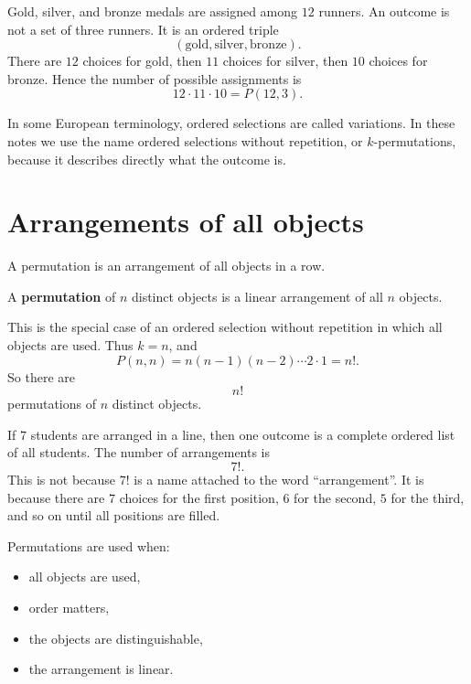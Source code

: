 \begin{examplebox}
Gold, silver, and bronze medals are assigned among \(12\) runners. An outcome is not a set of three runners. It is an ordered triple
\[
(\text{gold},\text{silver},\text{bronze}).
\]
There are \(12\) choices for gold, then \(11\) choices for silver, then \(10\) choices for bronze. Hence the number of possible assignments is
\[
12\cdot 11\cdot 10=P(12,3).
\]
\end{examplebox}

In some European terminology, ordered selections are called variations. In these notes we use the name ordered selections without repetition, or \(k\)-permutations, because it describes directly what the outcome is.

\section{Arrangements of all objects}

A permutation is an arrangement of all objects in a row.

\begin{definitionbox}
A \textbf{permutation} of \(n\) distinct objects is a linear arrangement of all \(n\) objects.
\end{definitionbox}

This is the special case of an ordered selection without repetition in which all objects are used. Thus \(k=n\), and
\[
P(n,n)=n(n-1)(n-2)\cdots 2\cdot 1=n!.
\]
So there are
\[
n!
\]
permutations of \(n\) distinct objects.

\begin{examplebox}
If \(7\) students are arranged in a line, then one outcome is a complete ordered list of all students. The number of arrangements is
\[
7!.
\]
This is not because \(7!\) is a name attached to the word ``arrangement''. It is because there are \(7\) choices for the first position, \(6\) for the second, \(5\) for the third, and so on until all positions are filled.
\end{examplebox}

Permutations are used when:
\begin{itemize}
    \item all objects are used,
    \item order matters,
    \item the objects are distinguishable,
    \item the arrangement is linear.
\end{itemize}

